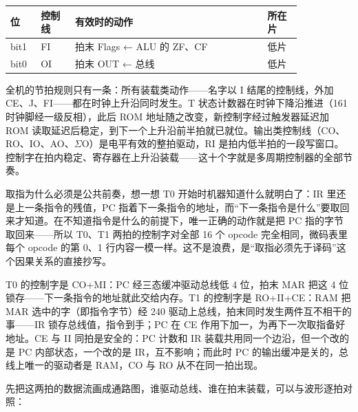 \begin{longtable}{L{0.08\linewidth}L{0.10\linewidth}L{0.56\linewidth}L{0.10\linewidth}}
\toprule
位 & 控制线 & 有效时的动作 & 所在片 \\
\midrule
bit1 & FI & 拍末 Flags ← ALU 的 ZF、CF & 低片 \\\tablerowrule
bit0 & OI & 拍末 OUT ← 总线 & 低片 \\
\bottomrule
\end{longtable}

全机的节拍规则只有一条：所有装载类动作——名字以 I 结尾的控制线，外加 CE、J、FI——都在时钟上升沿同时发生。T 状态计数器在时钟下降沿推进（161 时钟脚经一级反相），此后 ROM 地址随之改变，新控制字经过触发器延迟加 ROM 读取延迟后稳定，到下一个上升沿前半拍就已就位。输出类控制线（CO、RO、IO、AO、$\Sigma$O）是电平有效的整拍驱动，RI 是拍内低半拍的一段写窗口。控制字在拍内稳定、寄存器在上升沿装载——这十个字就是多周期控制器的全部节奏。

取指为什么必须是公共前奏，想一想 T0 开始时机器知道什么就明白了：IR 里还是上一条指令的残值，PC 指着下一条指令的地址，而“下一条指令是什么”要取回来才知道。在不知道指令是什么的前提下，唯一正确的动作就是把 PC 指的字节取回来——所以 T0、T1 两拍的控制字对全部 16 个 opcode 完全相同，微码表里每个 opcode 的第 0、1 行内容一模一样。这不是浪费，是“取指必须先于译码”这个因果关系的直接抄写。

T0 的控制字是 CO+MI：PC 经三态缓冲驱动总线低 4 位，拍末 MAR 把这 4 位锁存——下一条指令的地址就此交给内存。T1 的控制字是 RO+II+CE：RAM 把 MAR 选中的字（即指令字节）经 240 驱动上总线，拍末同时发生两件互不相干的事——IR 锁存总线值，指令到手；PC 在 CE 作用下加一，为再下一次取指备好地址。CE 与 II 同拍是安全的：PC 计数和 IR 装载共用同一个边沿，但一个改的是 PC 内部状态，一个改的是 IR，互不影响；而此时 PC 的输出缓冲是关的，总线上唯一的驱动者是 RAM，CO 与 RO 从不在同一拍出现。

先把这两拍的数据流画成通路图，谁驱动总线、谁在拍末装载，可以与波形逐拍对照：

